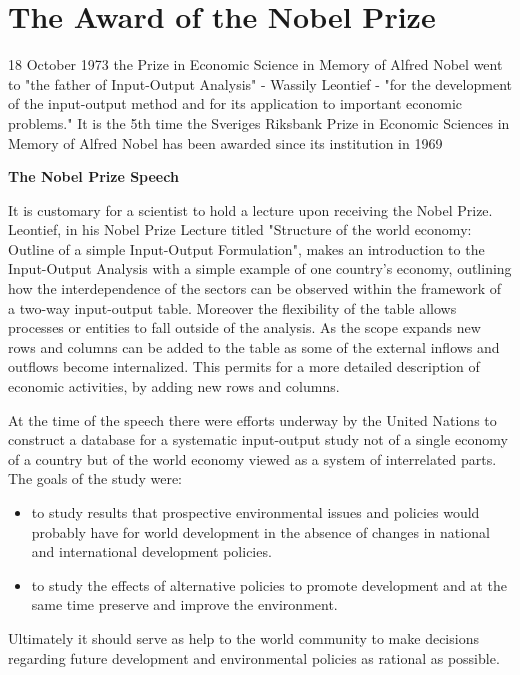 \documentclass[12pt,a4paper]{scrartcl}
\begin{document}
	\section{The Award of the Nobel Prize} \label{nobelprize}
	
	18 October 1973 the Prize in Economic Science in Memory of Alfred Nobel went to "the father of Input-Output Analysis" - Wassily Leontief - "for the development of the input-output method and for its application to important economic problems." \cite[]{nobelpress} It is the 5th time the Sveriges Riksbank Prize in Economic Sciences in Memory of Alfred Nobel has been awarded since its institution in 1969
	
	\textbf{The Nobel Prize Speech}
	
	It is customary for a scientist to hold a lecture upon receiving the Nobel Prize. Leontief, in his Nobel Prize Lecture titled "Structure of the world economy: Outline of a simple Input-Output Formulation", makes an introduction to the Input-Output Analysis with a simple example of one country's economy, outlining how the interdependence of the sectors can be observed within the framework of a two-way input-output table. Moreover the flexibility of the table allows processes or entities to fall outside of the analysis. As the scope expands new rows and columns can be added to the table as some of the external inflows and outflows become internalized. This permits for a more detailed description of economic activities, by adding new rows and columns.
	
	At the time of the speech there were efforts underway by the United Nations to construct a database for a systematic input-output study not of a single economy of a country but of the world economy viewed as a system of interrelated parts. The goals of the study were:
	
	\begin{itemize}
		\item  to study results that prospective environmental issues and policies would probably have for world development in the absence of changes in national and international development policies.
		\item to study the effects of alternative policies to promote development and at the same time preserve and improve the environment.
	\end{itemize}

	Ultimately it should serve as help to the world community to make decisions regarding future development and environmental policies as rational as possible.
	
\end{document}
